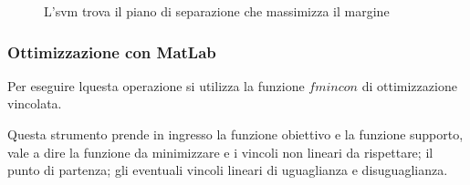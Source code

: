 \begin{figure}
\centering

\caption{L'\acs{svm} trova il piano di separazione che massimizza il margine}
\label{fig:clus_svm}
\end{figure}

\subsubsection{Ottimizzazione con MatLab}
Per eseguire lquesta operazione si utilizza la funzione
\(fmincon\) di ottimizzazione vincolata.

\par
Questa strumento prende in ingresso
la funzione obiettivo e la funzione supporto,
vale a dire la funzione da minimizzare e i vincoli non lineari da rispettare;
il punto di partenza;
gli eventuali vincoli lineari di uguaglianza e disuguaglianza.


